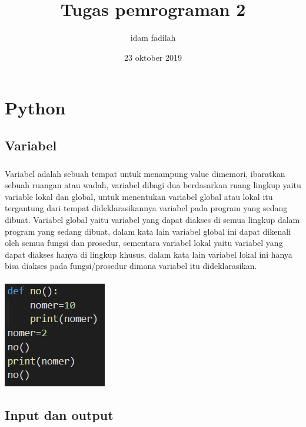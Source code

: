 \documentclass[a4paper,12pt]{report}
\title{Tugas pemrograman 2}
\author{idam fadilah}
\date{23 oktober 2019}
\begin{document}
\maketitle
\chapter{Python}
\section{Variabel}
\paragraph{}
Variabel adalah sebuah tempat untuk menampung value dimemori, ibaratkan sebuah ruangan atau wadah,  variabel dibagi dua berdasarkan ruang lingkup yaitu variable lokal dan global, untuk menentukan variabel global atau lokal itu tergantung dari tempat dideklarasikannya variabel pada program yang sedang dibuat. Variabel global yaitu variabel yang dapat diakses di semua lingkup  dalam program yang sedang dibuat, dalam kata lain variabel global ini dapat dikenali oleh semua fungsi dan prosedur, sementara variabel lokal yaitu variabel yang dapat diakses hanya di lingkup khusus, dalam kata lain variabel lokal ini hanya bisa diakses pada fungsi/prosedur dimana variabel itu dideklarasikan.\\ \\
\includegraphics[scale=1]{images/variabel.png} 
\section{Input dan output}
\end{document}
